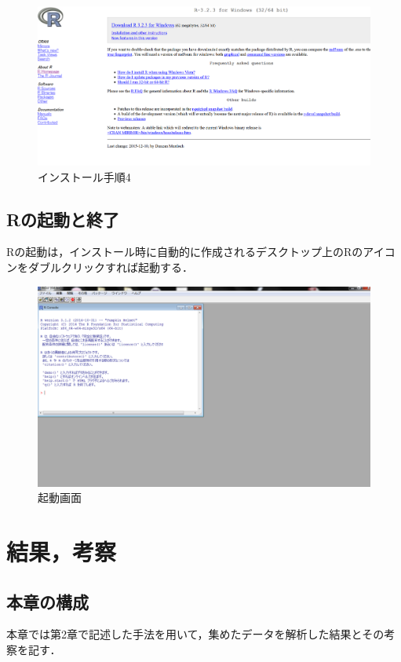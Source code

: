 \begin{figure}[H]
\centering
\includegraphics[width=15cm]{R004.png}
\caption{インストール手順4}\label{R004の画像}
\end{figure}

\section{Rの起動と終了}
Rの起動は，インストール時に自動的に作成されるデスクトップ上のRのアイコンをダブルクリックすれば起動する．

\begin{figure}[H]
\centering
\includegraphics[width=15cm]{R005.png}
\caption{起動画面}\label{R005の画像}
\end{figure}



\chapter{結果，考察}

\section{本章の構成}
本章では第2章で記述した手法を用いて，集めたデータを解析した結果とその考察を記す．

